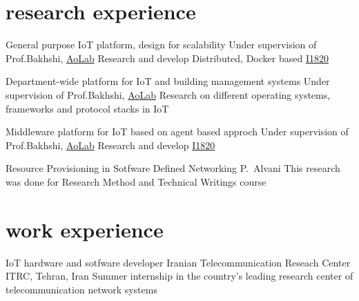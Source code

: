 \documentclass[]{friggeri-cv} %
\begin{document}
\section{research experience}

\begin{entrylist}

	{General purpose IoT platform, design for scalability}
	{Under supervision of Prof.Bakhshi, \href{https://aolab.github.io/}{AoLab}}
	{Research and develop Distributed, Docker based \href{https://I1820.github.io}{I1820}}
	
	{Department-wide platform for IoT and building management systems}
	{Under supervision of Prof.Bakhshi, \href{https://aolab.github.io/}{AoLab}}
	{Research on different operating systems, frameworks and protocol stacks in IoT}
	
	{Middleware platform for IoT based on agent based approch}
	{Under supervision of Prof.Bakhshi, \href{https://aolab.github.io/}{AoLab}}
	{Research and develop \href{https://I1820.github.io}{I1820}}

	{Resource Provisioning in Sotfware Defined Networking}
	{P.\ Alvani}
	{This research was done for Research Method and Technical Writings course}

\end{entrylist}


\section{work experience}

\begin{entrylist}

	{IoT hardware and sotfware developer}
	{Iranian Telecommunication Reseach Center ITRC, Tehran, Iran}
	{Summer internship in the country's leading research center of telecommunication network systems}
	
\end{entrylist}
\pagebreak

\end{document}
